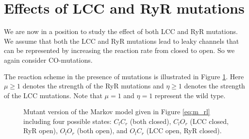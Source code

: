 \section{Effects of LCC and RyR mutations}

We are now in a position to study the effect of both LCC and RyR mutations. We
assume that both the LCC and RyR mutations lead to leaky channels that can be
represented by increasing the reaction rate from closed to open. So we again consider CO-mutations. 

The reaction scheme in the presence of mutations is illustrated in Figure \ref{Eq:m_rl_m}.
Here $\mu\geq1$ denotes the
strength of the RyR mutations and $\eta\geq1$ denotes the strength of the LCC
mutations. Note that $\mu=1$ and $\eta=1$ represent the wild type.

\begin{figure}[ptb]
\begin{center}
\end{center}
\caption{Mutant version of the Markov model given in Figure \ref{eq:m_rl}
including four possible states: $C_{l}C_{r}$ (both
closed), $C_{l}O_{r}$ (LCC closed, RyR open), $O_{l}O_{r}$ (both open), and
$O_{l}C_{r}$ (LCC open, RyR closed).}%
\label{Eq:m_rl_m}%
\end{figure}
 
